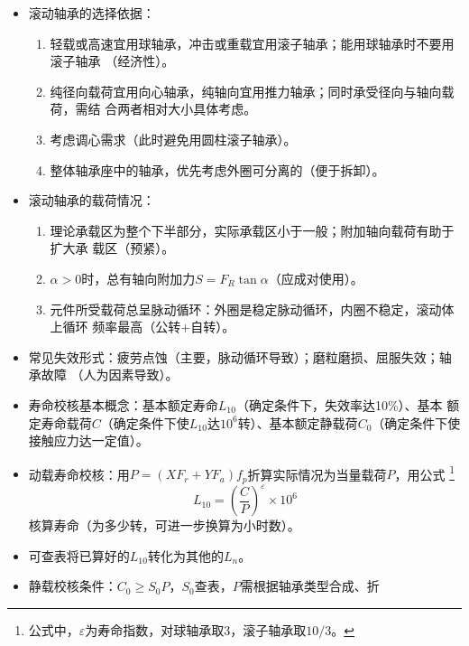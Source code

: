 \documentclass[12pt,a4paper]{article}
\newcommand{\tightlist}{\setlength{\parskip}{0pt}\setlength{\itemsep}{0pt}}
\newcommand{\hint}[1]{\textsf{（#1）}}
\newcommand{\minor}[1]{{\color{gray} #1}}
\begin{document}
\begin{itemize}
\begin{itemize}
{        应标出``/Pn''}。
        \item 游隙代号：\minor{系列为$120345$}，一般为$0$并省略\minor{，否则应标出
        ``/Cn''}。
    \end{itemize}
    \item 滚动轴承的选择依据：
    \begin{enumerate}\tightlist
        \item 轻载或高速宜用球轴承，冲击或重载宜用滚子轴承；能用球轴承时不要用滚子轴承
        \hint{经济性}。
        \item 纯径向载荷宜用向心轴承，纯轴向宜用推力轴承；同时承受径向与轴向载荷，需结
        合两者相对大小具体考虑。
        \item 考虑调心需求\hint{此时避免用圆柱滚子轴承}。
        \item 整体轴承座中的轴承，优先考虑外圈可分离的\hint{便于拆卸}。
    \end{enumerate}
    \item 滚动轴承的载荷情况：
    \begin{enumerate}\tightlist
        \item 理论承载区为整个下半部分，实际承载区小于一般；附加轴向载荷有助于扩大承
        载区\hint{预紧}。
        \item $\alpha>0$时，总有轴向附加力$S=F_R\tan\alpha$\hint{应成对使用}。
        \item 元件所受载荷总呈脉动循环：外圈是稳定脉动循环，内圈不稳定，滚动体上循环
        频率最高\hint{公转+自转}。
    \end{enumerate}
    \item 常见失效形式：疲劳点蚀\hint{主要，脉动循环导致}；磨粒磨损、屈服失效；轴承故障
    \hint{人为因素导致}。
    \item 寿命校核基本概念：基本额定寿命$L_{10}$\hint{确定条件下，失效率达10\%}、基本
    额定寿命载荷$C$\hint{确定条件下使$L_{10}$达$10^6$转}、基本额定静载荷$C_0$\hint{确定条件下使接触应力达一定值}。
    \item 动载寿命校核：用$P=(XF_r+YF_a)f_p$折算实际情况为当量载荷$P$，用公式
    \footnote{公式中，$\varepsilon$为寿命指数，对球轴承取$3$，滚子轴承取$10/3$。}
    \begin{equation}
        L_{10}=\left(\frac CP\right)^\varepsilon\times10^6
    \end{equation}
    核算寿命\hint{为多少转，可进一步换算为小时数}。
    \item \minor{可查表将已算好的$L_{10}$转化为其他的$L_n$。}
    \item \minor{静载校核条件：$C_0\geq S_0P$，$S_0$查表，$P$需根据轴承类型合成、折
}
\end{itemize}
\end{document}
